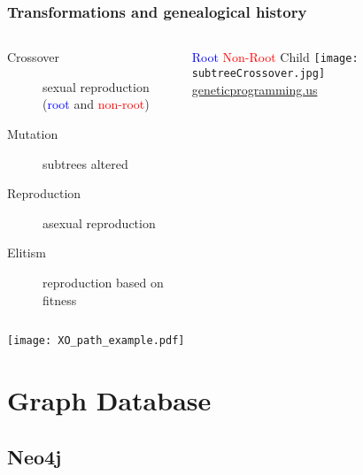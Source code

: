 \documentclass{beamer}
\begin{document}
\begin{frame}
\frametitle{Transformations and genealogical history}
\begin{columns}
\begin{column}{0.55\textwidth}
{\footnotesize
		\begin{description}
		\item[Crossover] sexual reproduction \\ (\textcolor{blue}{root} and \textcolor{red}{non-root})
		\item[Mutation] subtrees altered
		\item[Reproduction] asexual reproduction
		\item[Elitism] reproduction based on fitness
		\end{description}
}
\end{column}
\begin{column}{0.45\textwidth}
{\tiny \hspace{0.3cm} \textcolor{blue}{Root} \hspace{1cm} \textcolor{red}{Non-Root} \hspace{1cm} Child}
\texttt{[image: subtreeCrossover.jpg]} \\
{\tiny \hspace{2.5cm} \url{geneticprogramming.us}}
\end{column}
\end{columns}
\vspace*{-0.5cm}
\begin{center}
\texttt{[image: XO\_path\_example.pdf]}
\end{center}
\end{frame}

\section{Graph Database}
\subsection{Neo4j}
\end{document}
